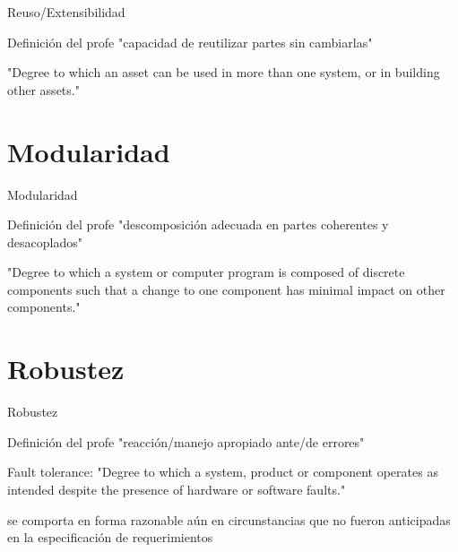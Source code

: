 \begin{frame}{Reuso/Extensibilidad}
    \begin{block}{Definición del profe}
        "\space capacidad de reutilizar partes sin cambiarlas"
    \end{block}
    \begin{alertblock}{\cite{ISO25010}}
        "Degree to which an asset can be used in more than one system, or in building other assets."
    \end{alertblock}
\end{frame}

\section{Modularidad}

\begin{frame}{Modularidad}
    \begin{block}{Definición del profe}
        "descomposición adecuada en partes coherentes y desacoplados"
    \end{block}
    \begin{alertblock}{\cite{ISO25010}}
        "Degree to which a system or computer program is composed of discrete components such that a change to one component has minimal impact on other components."
    \end{alertblock}
\end{frame}

\section{Robustez}

\begin{frame}{Robustez}
    \begin{block}{Definición del profe}
        "\space reacción/manejo apropiado ante/de errores"
    \end{block}
    \begin{alertblock}{\cite{ISO25010}}
        Fault tolerance: "Degree to which a system, product or component operates as intended despite the presence of hardware or software faults."
    \end{alertblock}
    \begin{exampleblock}{\cite{2002Fose}}
        \begin{quoting} se comporta en forma razonable aún en circunstancias que no fueron anticipadas en la especificación de requerimientos \end{quoting}
    \end{exampleblock}
\end{frame}

